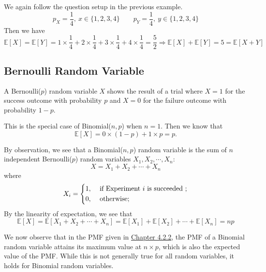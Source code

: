\begin{eg}
    We again follow the question setup in the previous example.
    \[
        p_X = \dfrac{1}{4},\ x \in \{1, 2, 3, 4\} \quad\quad p_Y = \dfrac{1}{4},\ y \in \{1, 2, 3, 4\}
    \]
    Then we have 
    \[
        \mathbb{E}[X] = \mathbb{E}[Y] = 1 \times \dfrac{1}{4} + 2 \times \dfrac{1}{4} + 3 \times \dfrac{1}{4} + 4 \times \dfrac{1}{4} = \dfrac{5}{2} \Longrightarrow \mathbb{E}[X] + \mathbb{E}[Y] = 5 = \mathbb{E}[X + Y]
    \]
\end{eg}

\subsection{Bernoulli Random Variable}
A Bernoulli(\(p\)) random variable \(X\)  shows the result of a trial where \(X = 1\) for the success outcome with probability \(p\) and \(X = 0\) for the failure outcome with probability \(1 - p\). 

This is the special case of Binomial(\(n, p\)) when \(n = 1\). Then we know that 
\[
    \mathbb{E}[X] = 0 \times (1 - p) + 1 \times p = p. 
\]

By observation, we see that a Binomial(\(n, p\)) random variable is the sum of \(n\) independent Bernoulli(\(p\)) random variables \(X_1, X_2, \cdots, X_n\):
\[
    X = X_1 + X_2 + \cdots + X_n
\]
where
\[
    X_i = \begin{dcases}
        1, &\text{ if Experiment \(i\) is succeeded }  ;\\
        0, &\text{ otherwise}  ;
    \end{dcases}
\]
By the linearity of expectation, we see that 
\[
    \mathbb{E}[X] = \mathbb{E}[X_1 + X_2 + \cdots + X_n] = \mathbb{E}[X_1] + \mathbb{E}[X_2] + \cdots + \mathbb{E}[X_n] = np
\]

We now observe that in the PMF given in \hyperlink{page.17}{Chapter 4.2.2}, the PMF of a Binomial random variable attains its maximum value at \(n \times p\), which is also the expected value of the PMF. While this is not generally true for all random variables, it holds for Binomial random variables.

